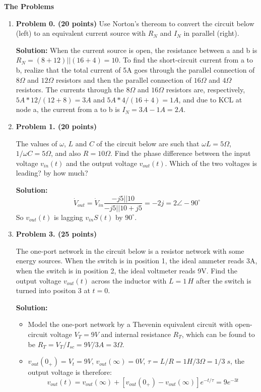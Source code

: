 {\bf The Problems}
\begin{enumerate}

\item {\bf Problem 0. (20 points)} 
Use Norton's thereom to convert the circuit below (left) to an equivalent 
current source with $R_N$ and $I_N$ in parallel (right).


{\bf Solution:} When the current source is open, the resistance between a 
and b is $R_N=(8+12)||(16+4)=10$. To find the short-circuit current from a 
to b, realize that the total current of 5A goes through the parallel connection 
of $8\Omega$ and $12\Omega$ resistors and then the parallel connection of 
$16\Omega$ and $4\Omega$ resistors. The currents through the $8\Omega$ and 
$16\Omega$ resistors are, respectively, $5A *12/(12+8)=3A$ and $5A *4/(16+4)=1A$,
and due to KCL at node a, the current from a to b is $I_N=3A-1A=2A$.

\item {\bf Problem 1. (20 points)} 

The values of $\omega$, $L$ and $C$ of the circuit below are such that 
$\omega L=5\Omega$, $1/\omega C=5\Omega$, and also $R=10\Omega$. Find the 
phase difference between the input voltage $v_{in}(t)$ and the output 
voltage $v_{out}(t)$. Which of the two voltages is leading? by how much?


{\bf Solution:} 
\[ \dot{V}_{out}=\dot{V}_{in} \frac{-j5||10}{-j5||10+j5}=-2j=2\angle -90^\circ \]
So $v_{out}(t)$ is lagging $v_{in}S(t)$ by $90^\circ$.

\item {\bf Problem 3. (25 points)} 

The one-port network in the circuit below is a resistor network with some
energy sources. When the switch is in position 1, the ideal ammeter reads
3A, when the switch is in position 2, the ideal voltmeter reads 9V. Find 
the output voltage $v_{out}(t)$ across the inductor with $L=1\,H$ after 
the switch is turned into positon 3 at $t=0$.


{\bf Solution:} 
\begin{itemize}
\item Model the one-port network by a Thevenin equivalent circuit with 
open-circuit voltage $V_T=9V$ and internal resistance $R_T$, which can
be found to be $R_T=V_T/I_{sc}=9V/3A=3\Omega$.
\item $v_{out}(0_+)=V_t=9V$, $v_{out}(\infty)=0V$, $\tau=L/R=1H/3\Omega=1/3\;s$,
  the output voltage is therefore:
  \[ v_{out}(t)=v_{out}(\infty)+[v_{out}(0_+)-v_{out}(\infty)]e^{-t/\tau}
    =9 e^{-3t} \]
\end{itemize}


\end{enumerate}
